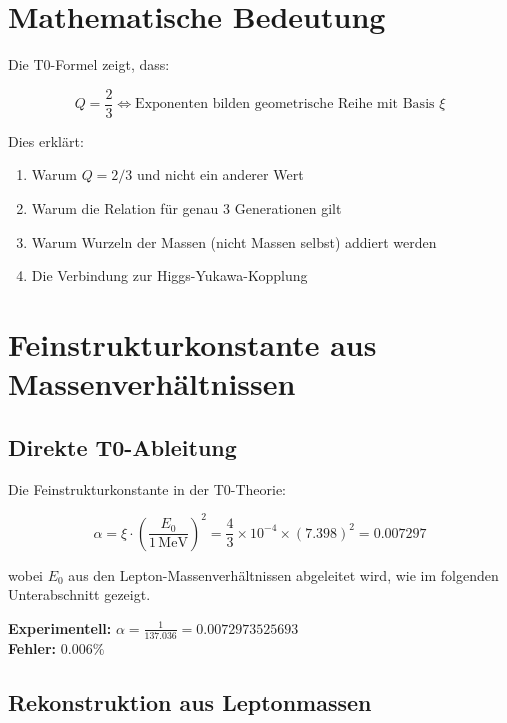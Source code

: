 	\section{Mathematische Bedeutung}
	
	Die T0-Formel zeigt, dass:
	
	\begin{equation}
		Q = \frac{2}{3} \iff \text{Exponenten bilden geometrische Reihe mit Basis } \xi
	\end{equation}
	
	Dies erklärt:
	\begin{enumerate}
		\item Warum $Q = 2/3$ und nicht ein anderer Wert
		\item Warum die Relation für genau 3 Generationen gilt
		\item Warum Wurzeln der Massen (nicht Massen selbst) addiert werden
		\item Die Verbindung zur Higgs-Yukawa-Kopplung
	\end{enumerate}
	
	\section{Feinstrukturkonstante aus Massenverhältnissen}
	
	\subsection{Direkte T0-Ableitung}
	
	Die Feinstrukturkonstante in der T0-Theorie:
	
	\begin{equation}
		\alpha = \xi \cdot \left(\frac{E_0}{1\,\text{MeV}}\right)^2 = \frac{4}{3} \times 10^{-4} \times (7.398)^2 = 0.007297
	\end{equation}
	
	wobei $E_0$ aus den Lepton-Massenverhältnissen abgeleitet wird, wie im folgenden Unterabschnitt gezeigt.
	
	\textbf{Experimentell:} $\alpha = \frac{1}{137.036} = 0.0072973525693$\\
	\textbf{Fehler:} $0.006\%$
	
	\subsection{Rekonstruktion aus Leptonmassen}
	
